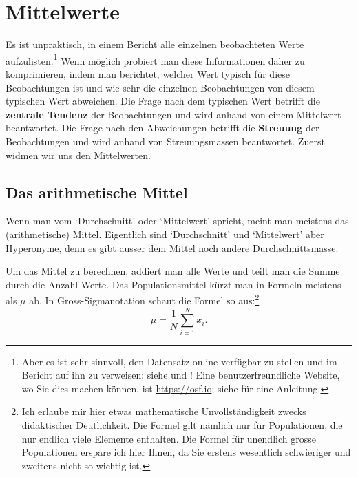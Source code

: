 \documentclass[oneside, 10pt]{book}\usepackage[]{graphicx}\usepackage[]{xcolor}
\begin{document}
\section{Mittelwerte}
Es ist unpraktisch, in einem Bericht alle einzelnen
beobachteten Werte aufzulisten.\footnote{Aber es ist sehr sinnvoll,
den Datensatz online verfügbar zu stellen und im Bericht auf ihn
zu verweisen; siehe \citet{Klein2018} und \citet{Levenstein2018}! Eine benutzerfreundliche Website, wo Sie dies machen können, ist \url{https://osf.io}; siehe \citet{Soderberg2018} für eine Anleitung.} Wenn möglich probiert
man diese Informationen daher zu komprimieren, indem
man berichtet, welcher Wert typisch für diese Beobachtungen
ist und wie sehr die einzelnen Beobachtungen von diesem
typischen Wert abweichen.
Die Frage nach dem typischen Wert betrifft die \textbf{zentrale Tendenz}
der Beobachtungen und wird anhand von einem Mittelwert
beantwortet. Die Frage nach den Abweichungen betrifft die
\textbf{Streuung} der Beobachtungen und wird anhand von Streuungsmassen
beantwortet. Zuerst widmen wir uns den Mittelwerten.

\subsection{Das arithmetische Mittel}
Wenn man vom `Durchschnitt' oder `Mittelwert' spricht,
meint man meistens das (arithmetische) Mittel.
Eigentlich sind `Durchschnitt' und `Mittelwert' aber Hyperonyme,
denn es gibt ausser dem Mittel noch andere Durchschnittsmasse.

Um das Mittel zu berechnen, addiert
man alle Werte und teilt man die Summe durch die Anzahl Werte.
Das Populationsmittel kürzt man in Formeln meistens als $\mu$ ab.
In Gross-Sigmanotation schaut die Formel so aus:\footnote{Ich
erlaube mir hier etwas mathematische Unvollständigkeit zwecks
didaktischer Deutlichkeit. Die Formel gilt nämlich nur
für Populationen, die nur endlich viele Elemente enthalten.
Die Formel für unendlich grosse Populationen erspare ich hier Ihnen,
da Sie erstens wesentlich schwieriger und zweitens nicht so wichtig ist.}
\begin{equation*}
\mu = \frac{1}{N} \sum_{i = 1}^{N} x_i.
\end{equation*}

\medskip
\end{document}
